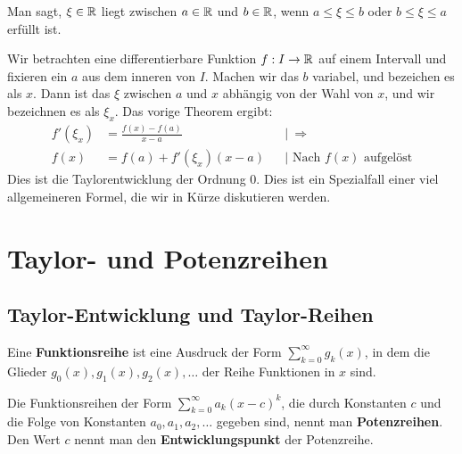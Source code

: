 \begin{defn}
	Man sagt, $\xi \in \mathbb{R}$ liegt zwischen $a \in \mathbb{R}$ und $b \in \mathbb{R}$, wenn $a \le \xi \le b$ oder $b \le \xi \le a$ erfüllt ist. 
\end{defn} 


\begin{bem} 
	Wir betrachten eine differentierbare Funktion $f : I \to \mathbb{R}$ auf einem Intervall und fixieren ein $a$ aus dem inneren von $I$. 
	Machen wir das $b$ variabel, und bezeichen es als $x$. Dann ist das $\xi$ zwischen $a$ und $x$ abhängig von der Wahl von $x$, und wir bezeichnen es als $\xi_x$. Das vorige Theorem ergibt: 
	\begin{align*}
		f'(\xi_x)  & = \frac{f(x)-f(a)}{x-a}  & & |\ \Rightarrow 
		\\ f(x) & = f(a) + f'(\xi_x) (x-a) & & |\text{ Nach $f(x)$ aufgelöst} 
	\end{align*}
	Dies ist die Taylorentwicklung der Ordnung $0$. 
	Dies ist ein Spezialfall einer viel allgemeineren Formel, die wir in Kürze diskutieren werden. 
\end{bem} 

\chapter{Taylor- und Potenzreihen} 

\section{Taylor-Entwicklung und Taylor-Reihen} 

\begin{defn} 
	Eine \textbf{Funktionsreihe} ist eine Ausdruck der Form $\sum_{k=0}^\infty g_k(x)$, in dem die Glieder $g_0(x),g_1(x),g_2(x),\ldots$ der Reihe Funktionen in $x$ sind. 
	
	Die Funktionsreihen der Form $\sum_{k=0}^\infty a_k (x-c)^k$, die durch Konstanten $c$ und die Folge von Konstanten $a_0,a_1,a_2,\ldots$ gegeben sind,  nennt man \textbf{Potenzreihen}. Den Wert $c$ nennt man den \textbf{Entwicklungspunkt} der Potenzreihe. 
\end{defn} 



